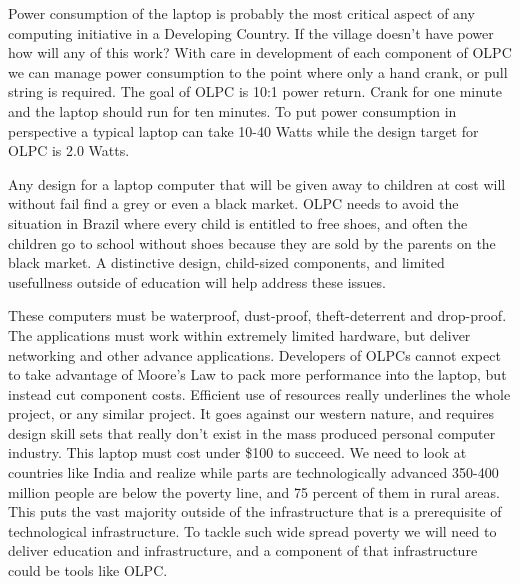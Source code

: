 \documentclass[12pt,twoside,letterpaper]{article}
\begin{document}
Power consumption of the laptop is probably the most critical aspect of any computing initiative in a Developing Country. If the village doesn't have power how will any of this work? With care in development of each component of OLPC we can manage power consumption to the point where only a hand crank, or pull string is required. The goal of OLPC is 10:1 power return. Crank for one minute and the laptop should run for ten minutes. To put power consumption in perspective a typical laptop can take 10-40 Watts while the design target for OLPC is 2.0 Watts.

Any design for a laptop computer that will be given away to children at cost will without fail find a grey or even a black market. OLPC needs to avoid the situation in Brazil where every child is entitled to free shoes, and often the children go to school without shoes because they are sold by the parents on the black market. A distinctive design, child-sized components, and limited usefullness outside of education will help address these issues.

These computers must be waterproof, dust-proof, theft-deterrent and drop-proof. The applications must work within extremely limited hardware, but deliver networking and other advance applications. Developers of OLPCs cannot expect to take advantage of Moore's Law to pack more performance into the laptop, but instead cut component costs. Efficient use of resources really underlines the whole project, or any similar project. It goes against our western nature, and requires design skill sets that really don't exist in the mass produced personal computer industry. This laptop must cost under \$100 to succeed. We need to look at countries like India and realize while parts are technologically advanced 350-400 million people are below the poverty line, and 75 percent of them in rural areas. This puts the vast majority outside of the infrastructure that is a prerequisite of technological infrastructure. To tackle such wide spread poverty we will need to deliver education and infrastructure, and a component of that infrastructure could be tools like OLPC.


\end{document}
